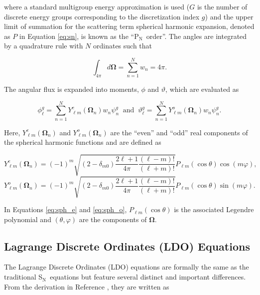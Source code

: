 \documentclass{article} %
\newcommand{\bo}{\mathbf\Omega}
\newcommand{\sn}{S$_\mathrm{N}$}
\newcommand{\pn}{P$_\mathrm{N}$}
\newcommand{\Ye}[2]{\ensuremath{Y^e_{#1}(\bo_#2)}}
\newcommand{\Yo}[2]{\ensuremath{Y^o_{#1}(\bo_#2)}}
\begin{document}
\noindent where a standard multigroup energy approximation is used ($G$ is the 
number of discrete energy groups corresponding to the discretization index $g$) and the 
upper limit of summation for the scattering term spherical harmonic expansion,
denoted as $P$ in Equation \ref{eq:sn}, is known as the ``\pn\ order''. The
angles are integrated by a quadrature rule with $N$ ordinates such that

\begin{equation}
\int_{4\pi} d\bo = \sum_{n=1}^{N}w_n = 4\pi.
\label{eq:quadrule}
\end{equation}

\noindent The angular flux is expanded into moments, $\phi$ and $\vartheta$, which are
evaluated as

\begin{equation}
\phi_{\ell}^{g}=\sum_{n=1}^N \Ye{\ell m}{n}w_n\psi^{g}_{n}\
\text{ and }\
\vartheta_{\ell}^{g} = \sum_{n=1}^N \Yo{\ell m}{n}w_n\psi^{g}_{n}.
\label{sph_harm_exp}
\end{equation}

\noindent Here, $\Ye{\ell m}{n}$ and $\Yo{\ell m}{n}$ are the ``even'' and
``odd'' real components of the spherical harmonic functions and are defined as

\begin{equation}
\Ye{\ell m}{n} = (-1)^m\sqrt{(2-\delta_{m0})\frac{2\ell+1}{4\pi}
                       \frac{(\ell-m)!}{(\ell+m)!}}
                       P_{\ell m}(\cos\theta)\cos(m\varphi),
\label{eq:sph_e}
\end{equation}
\begin{equation}
\Yo{\ell m}{n} = (-1)^m\sqrt{(2-\delta_{m0})\frac{2\ell+1}{4\pi}
                       \frac{(\ell-m)!}{(\ell+m)!}}
                       P_{\ell m}(\cos\theta)\sin(m\varphi).
\label{eq:sph_o}
\end{equation}

\noindent In Equations \ref{eq:sph_e} and \ref{eq:sph_o},
$P_{\ell m}(\cos\theta)$ is the associated Legendre polynomial and
$(\theta,\varphi)$ are the components of $\bo$.


\subsection{Lagrange Discrete Ordinates (LDO) Equations}

The Lagrange Discrete Ordinates (LDO) equations are formally the same as the
traditional \sn\ equations but feature several distinct and important
differences. From the derivation in Reference \cite{ahrens}, they are written
as
\end{document}
